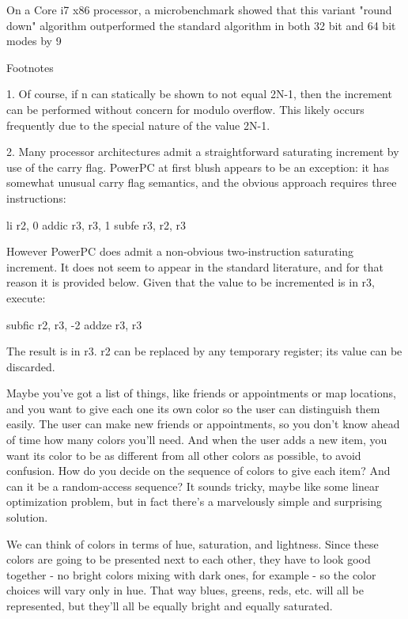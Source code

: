 On a Core i7 x86 processor, a microbenchmark showed that this variant "round down" algorithm outperformed the standard algorithm in both 32 bit and 64 bit modes by 9%

Footnotes

1. Of course, if n can statically be shown to not equal 2N-1, then the increment can be performed without concern for modulo overflow. This likely occurs frequently due to the special nature of the value 2N-1.

2. Many processor architectures admit a straightforward saturating increment by use of the carry flag. PowerPC at first blush appears to be an exception: it has somewhat unusual carry flag semantics, and the obvious approach requires three instructions:

    li r2, 0
    addic r3, r3, 1
    subfe r3, r2, r3

However PowerPC does admit a non-obvious two-instruction saturating increment. It does not seem to appear in the standard literature, and for that reason it is provided below. Given that the value to be incremented is in r3, execute:

    subfic r2, r3, -2
    addze r3, r3

    The result is in r3. r2 can be replaced by any temporary register; its value can be discarded.







Maybe you've got a list of things, like friends or appointments or map locations, and you want to give each one its own color so the user can distinguish them easily. The user can make new friends or appointments, so you don't know ahead of time how many colors you'll need. And when the user adds a new item, you want its color to be as different from all other colors as possible, to avoid confusion. How do you decide on the sequence of colors to give each item? And can it be a random-access sequence? It sounds tricky, maybe like some linear optimization problem, but in fact there's a marvelously simple and surprising solution.

We can think of colors in terms of hue, saturation, and lightness. Since these colors are going to be presented next to each other, they have to look good together - no bright colors mixing with dark ones, for example - so the color choices will vary only in hue. That way blues, greens, reds, etc. will all be represented, but they'll all be equally bright and equally saturated.

